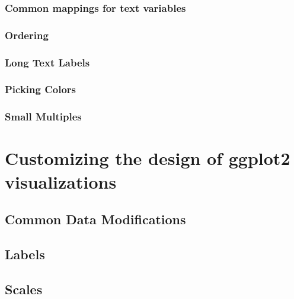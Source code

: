 \documentclass[
]{krantz}
\begin{document}
\hypertarget{common-mappings-for-text-variables}{%
\subsection{Common mappings for text variables}\label{common-mappings-for-text-variables}}

\hypertarget{ordering}{%
\subsection{Ordering}\label{ordering}}

\hypertarget{long-text-labels}{%
\subsection{Long Text Labels}\label{long-text-labels}}

\hypertarget{picking-colors}{%
\subsection{Picking Colors}\label{picking-colors}}

\hypertarget{small-multiples}{%
\subsection{Small Multiples}\label{small-multiples}}

\hypertarget{customizing-visualization-design}{%
\chapter{Customizing the design of ggplot2 visualizations}\label{customizing-visualization-design}}

\hypertarget{common-data-modifications}{%
\section{Common Data Modifications}\label{common-data-modifications}}

\hypertarget{labels}{%
\section{Labels}\label{labels}}

\hypertarget{scales}{%
\section{Scales}\label{scales}}
\end{document}
